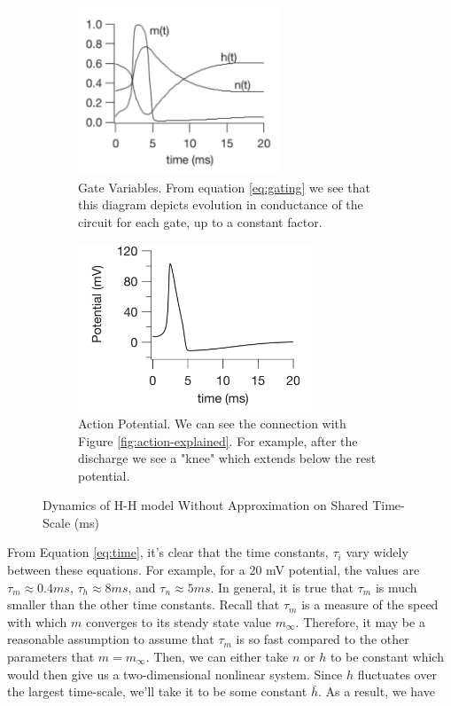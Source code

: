 \documentclass[12]{book}
\newcommand\0{\mathbf{0}}
\newcommand\<{\langle}
\renewcommand\>{\rangle}
\begin{document}
\begin{figure}[h]
\centering
\begin{subfigure}{.5\textwidth}
	\centering
	\includegraphics[height=5cm]{keener1.png}
	\caption{Gate Variables. From equation \ref{eq:gating} we see that this diagram depicts evolution in conductance of the circuit for each gate, up to a constant factor.}
\end{subfigure}%
\begin{subfigure}{.5\textwidth}
	\centering
	\includegraphics[height=5cm]{keener2.png}
	\caption{Action Potential. We can see the connection with Figure \ref{fig:action-explained}. For example, after the discharge we see a "knee" which extends below the rest potential.}
\end{subfigure}
	\caption{Dynamics of H-H model Without Approximation on Shared Time-Scale (ms)}
	\label{fig:keen}
\end{figure}


From Equation \ref{eq:time}, it's clear that the time constants, $\tau_i$ vary widely between these equations. For example, for a 20 mV potential, the values are $\tau_m \approx 0.4 ms$, $\tau_h \approx 8 ms$, and $\tau_n \approx 5 ms$. In general, it is true that $\tau_m$ is much smaller than the other time constants. Recall that $\tau_m$ is a measure of the speed with which $m$ converges to its steady state value $m_\infty$. Therefore, it may be a reasonable assumption to assume that $\tau_m$ is so fast compared to the other parameters that $m = m_\infty$. Then, we can either take $n$ or $h$ to be constant which would then give us a two-dimensional nonlinear system. Since $h$ fluctuates over the largest time-scale, we'll take it to be some constant $\bar{h}$. As a result, we have 
\end{document}
